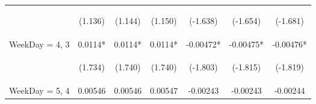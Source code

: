 \documentclass[]{article}
\begin{document}
\begin{center}
\begin{tabular}{lcccccc}
        \vspace{4pt}     & \begin{footnotesize}(1.136)\end{footnotesize}  & \begin{footnotesize}(1.144)\end{footnotesize}  & \begin{footnotesize}(1.150)\end{footnotesize}  & \begin{footnotesize}(-1.638)\end{footnotesize} & \begin{footnotesize}(-1.654)\end{footnotesize} & \begin{footnotesize}(-1.681)\end{footnotesize} \\
        WeekDay = 4, 3   & 0.0114*                                        & 0.0114*                                        & 0.0114*                                        & -0.00472*                                      & -0.00475*                                      & -0.00476*                                      \\
        \vspace{4pt}     & \begin{footnotesize}(1.734)\end{footnotesize}  & \begin{footnotesize}(1.740)\end{footnotesize}  & \begin{footnotesize}(1.740)\end{footnotesize}  & \begin{footnotesize}(-1.803)\end{footnotesize} & \begin{footnotesize}(-1.815)\end{footnotesize} & \begin{footnotesize}(-1.819)\end{footnotesize} \\
        WeekDay = 5, 4   & 0.00546                                        & 0.00546                                        & 0.00547                                        & -0.00243                                       & -0.00243                                       & -0.00244                                       \\

\end{tabular}
\end{center}
\end{document}
